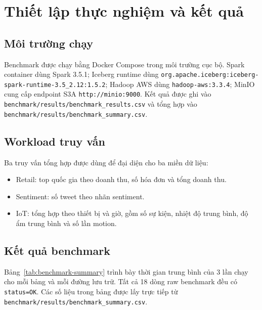 \section{Thiết lập thực nghiệm và kết quả}

\subsection{Môi trường chạy}

Benchmark được chạy bằng Docker Compose trong môi trường cục bộ. Spark container dùng Spark 3.5.1; Iceberg runtime dùng \texttt{org.apache.iceberg:iceberg-spark-runtime-3.5\_2.12:1.5.2}; Hadoop AWS dùng \texttt{hadoop-aws:3.3.4}; MinIO cung cấp endpoint S3A \texttt{http://minio:9000}. Kết quả được ghi vào \texttt{benchmark/results/benchmark\_results.csv} và tổng hợp vào \texttt{benchmark/results/benchmark\_summary.csv}.

\subsection{Workload truy vấn}

Ba truy vấn tổng hợp được dùng để đại diện cho ba miền dữ liệu:

\begin{itemize}
\item Retail: top quốc gia theo doanh thu, số hóa đơn và tổng doanh thu.
\item Sentiment: số tweet theo nhãn sentiment.
\item IoT: tổng hợp theo thiết bị và giờ, gồm số sự kiện, nhiệt độ trung bình, độ ẩm trung bình và số lần motion.
\end{itemize}

\subsection{Kết quả benchmark}

Bảng~\ref{tab:benchmark-summary} trình bày thời gian trung bình của 3 lần chạy cho mỗi bảng và mỗi đường lưu trữ. Tất cả 18 dòng raw benchmark đều có \texttt{status=OK}. Các số liệu trong bảng được lấy trực tiếp từ \texttt{benchmark/results/benchmark\_summary.csv}.

